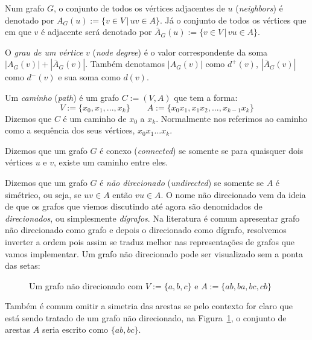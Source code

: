 \begin{mydef}
  Num grafo $G$, o conjunto de todos os vértices adjacentes de $u$
  (\textit{neighbors}) é denotado por $A_G(u) := \{v \in V\, |\, uv \in
  A\}$. Já o conjunto de todos os vértices que em que $v$ é adjacente
  será denotado por $\bar{A}_G(u) := \{ v \in V\, |\, vu \in A\}$.
\end{mydef}

\begin{mydef}
  O \emph{grau de um vértice} $v$ (\textit{node degree}) é o valor
  correspondente da soma $|A_G(v)| + |\bar{A}_G(v)|$. Também
  denotamos $|A_G(v)|$ como $d^+(v)$, $|\bar{A}_G(v)|$ como $d^-(v)$ e
  sua soma como $d(v)$.
\end{mydef}

\begin{mydef}[Caminho]
  Um \emph{caminho} (\textit{path}) é um grafo $C := (V, A)$ que tem a forma:
  \begin{displaymath}
    V := \{x_0, x_1,...,x_k\} \qquad A := \{x_0x_1,x_1x_2,...,x_{k-1}x_k\}
  \end{displaymath}
  Dizemos que $C$ é um caminho de $x_0$ a $x_k$. Normalmente nos
  referimos ao caminho como a sequência dos seus vértices, $x_0x_1...x_k$.
\end{mydef}

\begin{mydef}[Conectividade]
  Dizemos que um grafo $G$ é conexo (\textit{connected}) se somente
  se para quaisquer dois vértices $u$ e $v$, existe um caminho entre eles.
\end{mydef}

\begin{mydef}
  Dizemos que um grafo $G$ é \emph{não direcionado}
  (\textit{undirected}) se somente se $A$ é simétrico, ou seja, se
  $uv \in A$ então $vu \in A$. O nome não direcionado vem da ideia de
  que os grafos que viemos discutindo até agora são denomidados de
  \emph{direcionados}, ou simplesmente \emph{dígrafos}. Na
  literatura é comum apresentar grafo não direcionado como grafo e
  depois o direcionado como dígrafo, resolvemos inverter a ordem pois
  assim se traduz melhor nas representações de grafos que vamos
  implementar. Um grafo não direcionado pode ser visualizado sem a
  ponta das setas:

  \begin{figure}[h]
    \centering
    \caption{Um grafo não direcionado com $V := \{a,b,c\}$ e $A :=
    \{ab,ba,bc,cb\}$}
    \label{fig:ungraph1}
  \end{figure}

  Também é comum omitir a simetria das arestas se pelo contexto for
  claro que está sendo tratado de um grafo não direcionado, na
  Figura~\ref{fig:ungraph1}, o conjunto de arestas $A$ seria escrito
  como $\{ab,bc\}$.
\end{mydef}

